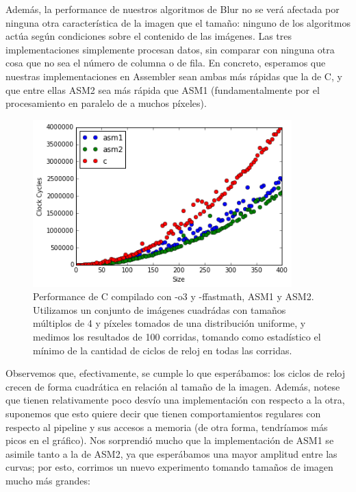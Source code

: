 Además, la performance de nuestros algoritmos de Blur no se verá afectada por ninguna otra característica de la imagen que el tamaño: ninguno de los algoritmos actúa según condiciones sobre el contenido de las imágenes. Las tres implementaciones simplemente procesan datos, sin comparar con ninguna otra cosa que no sea el número de columna o de fila. En concreto, esperamos que nuestras implementaciones en Assembler sean ambas más rápidas que la de C, y que entre ellas ASM2 sea más rápida que ASM1 (fundamentalmente por el procesamiento en paralelo de a muchos píxeles).

\begin{figure}[!b]
	\centering
  \includegraphics[width=10cm]{blur-imagenes-chicas.png}
  \caption{Performance de C compilado con -o3 y -ffastmath, ASM1 y ASM2. Utilizamos un conjunto de imágenes cuadrádas con tamaños múltiplos de 4 y píxeles tomados de una distribución uniforme, y medimos los resultados de 100 corridas, tomando como estadístico el mínimo de la cantidad de ciclos de reloj en todas las corridas.}
\end{figure}

Observemos que, efectivamente, se cumple lo que esperábamos: los ciclos de reloj crecen de forma cuadrática en relación al tamaño de la imagen. Además, notese que tienen relativamente poco desvío una implementación con respecto a la otra, suponemos que esto quiere decir que tienen comportamientos regulares con respecto al pipeline y sus accesos a memoria (de otra forma, tendríamos más picos en el gráfico). Nos sorprendió mucho que la implementación de ASM1 se asimile tanto a la de ASM2, ya que esperábamos una mayor amplitud entre las curvas; por esto, corrimos un nuevo experimento tomando tamaños de imagen mucho más grandes:

